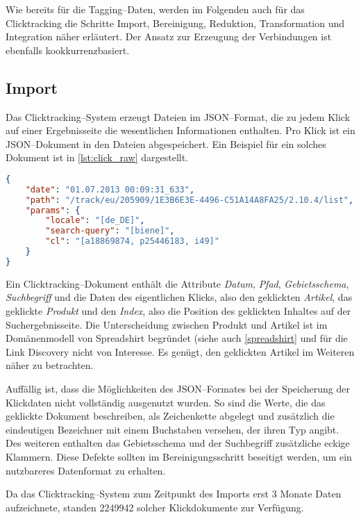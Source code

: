 Wie bereits für die Tagging--Daten, werden im Folgenden auch für das Clicktracking die Schritte Import, Bereinigung, Reduktion, Transformation und Integration näher erläutert. Der Ansatz zur Erzeugung der Verbindungen ist ebenfalls kookkurrenzbasiert.

\subsection{Import}
\label{click_import}

Das Clicktracking--System erzeugt Dateien im JSON--Format, die zu jedem Klick auf einer Ergebnisseite die wesentlichen Informationen enthalten. Pro Klick ist ein JSON--Dokument in den Dateien abgespeichert. Ein Beispiel für ein solches Dokument ist in \cref{lst:click_raw} dargestellt.

\begin{lstlisting}[language=json, label={lst:click_raw}, caption={Clicktracking - Rohdokument als JSON}]
{
    "date": "01.07.2013 00:09:31_633",
    "path": "/track/eu/205909/1E3B6E3E-4496-C51A14A8FA25/2.10.4/list",
    "params": {
        "locale": "[de_DE]",
        "search-query": "[biene]",
        "cl": "[a18869874, p25446183, i49]"
    }
}
\end{lstlisting}

Ein Clicktracking--Dokument enthält die Attribute \emph{Datum}, \emph{Pfad}, \emph{Gebietsschema}, \emph{Suchbegriff} und die Daten des eigentlichen Klicks, also den geklickten \emph{Artikel}, das geklickte \emph{Produkt} und den \emph{Index}, also die Position des geklickten Inhaltes auf der Suchergebnisseite. Die Unterscheidung zwischen Produkt und Artikel ist im Domänenmodell von Spreadshirt begründet (siehe auch \cref{spreadshirt} und für die Link Discovery nicht von Interesse. Es genügt, den geklickten Artikel im Weiteren näher zu betrachten.

Auffällig ist, dass die Möglichkeiten des JSON--Formates bei der Speicherung der Klickdaten nicht vollständig ausgenutzt wurden. So sind die Werte, die das geklickte Dokument beschreiben, als Zeichenkette abgelegt und zusätzlich die eindeutigen Bezeichner mit einem Buchstaben versehen, der ihren Typ angibt. Des weiteren enthalten  das Gebietsschema und der Suchbegriff zusätzliche eckige Klammern. Diese Defekte sollten im Bereinigungsschritt beseitigt werden, um ein nutzbareres Datenformat zu erhalten.

Da das Clicktracking--System zum Zeitpunkt des Imports erst 3 Monate Daten aufzeichnete, standen \num{2249942} solcher Klickdokumente zur Verfügung.

